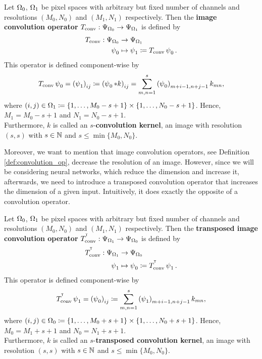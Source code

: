 \begin{definition}\label{def:convolution_op}
Let $\Omega_0$, $\Omega_1$ be pixel spaces with arbitrary but fixed number of channels and resolutions $(M_0,N_0)$ and $(M_1,N_1)$ respectively. Then the \textbf{image convolution operator} $T_{\text{conv}}: \Psi_{\Omega_0} \to \Psi_{\Omega_1}$ is defined by
\begin{align*}
T_{\text{conv}}: \Psi_{\Omega_0} &\to \Psi_{\Omega_1}\\
\operatorname{\psi}_0 &\mapsto \operatorname{\psi}_1 \coloneqq T_{\text{conv}}\operatorname{\psi}_0 .
\end{align*}
This operator is defined component-wise by
\begin{align}
T_{\text{conv}}\operatorname{\psi}_0 = \left( \operatorname{\psi}_1 \right)_{ij} \coloneqq  \left( \operatorname{\psi}_0 \ast k \right)_{ij} = \sum_{m,n=1}^s \left(\operatorname{\psi}_0\right)_{m+i-1,n+j-1}k_{mn},
\end{align}
where $(i,j) \in \Omega_1 \coloneqq \{1,\ldots, M_0-s+1\} \times \{1,\ldots, N_0-s+1\}$. Hence, $M_1 = M_0-s+1$ and $N_1 = N_0-s+1$.\\
Furthermore, $k$ is called an $s$-\textbf{convolution kernel}, an image with resolution $(s,s)$ with $s\in\operatorname{\mathbb{N}}$ and $s\leq \min\{M_0,N_0\}$.
\end{definition}

Moreover, we want to mention that image convolution operators, see Definition \ref{def:convolution_op}, decrease the resolution of an image. However, since we will be considering neural networks, which reduce the dimension and increase it, afterwards, we need to introduce a transposed convolution operator that increases the dimension of a given input. Intuitively, it does exactly the opposite of a convolution operator.

\begin{definition}\label{def:transposed_convolution_op}
Let $\Omega_0$, $\Omega_1$ be pixel spaces with arbitrary but fixed number of channels and resolutions $(M_0,N_0)$ and $(M_1,N_1)$ respectively. Then the \textbf{transposed image convolution operator} $T_{\text{conv}}^{^{\mkern-1.5mu\mathsf{T}}}: \Psi_{\Omega_1} \to \Psi_{\Omega_0}$ is defined by
\begin{align*}
T_{\text{conv}}^{^{\mkern-1.5mu\mathsf{T}}}: \Psi_{\Omega_1} &\to \Psi_{\Omega_0}\\
\operatorname{\psi}_1 &\mapsto \operatorname{\psi}_0 \coloneqq T_{\text{conv}}^{^{\mkern-1.5mu\mathsf{T}}}\operatorname{\psi}_1 .
\end{align*}
This operator is defined component-wise by
\begin{align}
T_{\text{conv}}^{^{\mkern-1.5mu\mathsf{T}}}\operatorname{\psi}_1 = \left( \operatorname{\psi}_0 \right)_{ij} \coloneqq  \sum_{m,n=1}^s \left(\operatorname{\psi}_1\right)_{m+i-1,n+j-1}k_{mn},
\end{align}
where $(i,j) \in \Omega_0 \coloneqq \{1,\ldots, M_0 + s+1\} \times \{1,\ldots, N_0+s+1\}$. Hence, $M_0 = M_1+s+1$ and $N_0 = N_1+s+1$.\\
Furthermore, $k$ is called an $s$-\textbf{transposed convolution kernel}, an image with resolution $(s,s)$ with $s\in\operatorname{\mathbb{N}}$ and $s\leq \min\{M_0,N_0\}$.
\end{definition}

